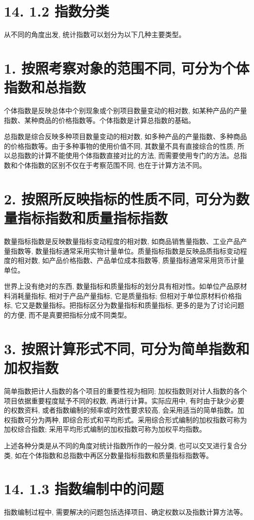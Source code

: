\documentclass[10pt]{article}
\begin{document}
\begin{CJK*}{UTF8}{bsmi}
\section*{14. 1.2 指数分类}
从不同的角度出发, 统计指数可以划分为以下几种主要类型。

\section*{1. 按照考察对象的范围不同, 可分为个体指数和总指数}
个体指数是反映总体中个别现象或个别项目数量变动的相对数, 如某种产品的产量指数、某种商品的价格指数等。个体指数是计算总指数的基础。

总指数是综合反映多种项目数量变动的相对数, 如多种产品的产量指数、多种商品的价格指数等。由于多种事物的使用价值不同, 其数量不具有直接综合的性质, 所以总指数的计算不能使用个体指数直接对比的方法, 而需要使用专门的方法。总指数和个体指数的区别不仅在于考察范围不同, 也在于计算方法不同。

\section*{2. 按照所反映指标的性质不同, 可分为数量指标指数和质量指标指数}
数量指标指数是反映数量指标变动程度的相对数, 如商品销售量指数、工业产品产量指数等, 数量指标通常采用实物计量单位。质量指标指数是反映品质指标变动程度的相对数, 如产品价格指数、产品单位成本指数等, 质量指标通常采用货币计量单位。

世界上没有绝对的东西, 数量指标和质量指标的划分具有相对性。如单位产品原材料消耗量指标, 相对于产品产量指标, 它是质量指标; 但相对于单位原材料价格指标, 它又是数量指标。把指标区分为数量指标和质量指标, 更多的是为了讨论问题的方便, 而不是真要把指标分成不同类型。

\section*{3. 按照计算形式不同, 可分为简单指数和加权指数}
简单指数把计人指数的各个项目的重要性视为相同; 加权指数则对计人指数的各个项目依据重要程度赋予不同的权数, 再进行计算。实际应用中, 有时由于缺少必要的权数资料, 或者指数编制的频率或时效性要求较高, 会采用适当的简单指数。加权指数可分为两种, 即综合形式和平均形式。采用综合形式编制的加权指数可称为加权综合指数; 采用平均形式编制的加权指数可称为加权平均指数。

上述各种分类是从不同的角度对统计指数所作的一般分类, 也可以交叉进行复合分类, 如在个体指数和总指数中再区分数量指标指数和质量指标指数等。

\section*{14. 1.3 指数编制中的问题}
指数编制过程中, 需要解决的问题包括选择项目、确定权数以及指数计算方法等。


\end{CJK*}
\end{document}
